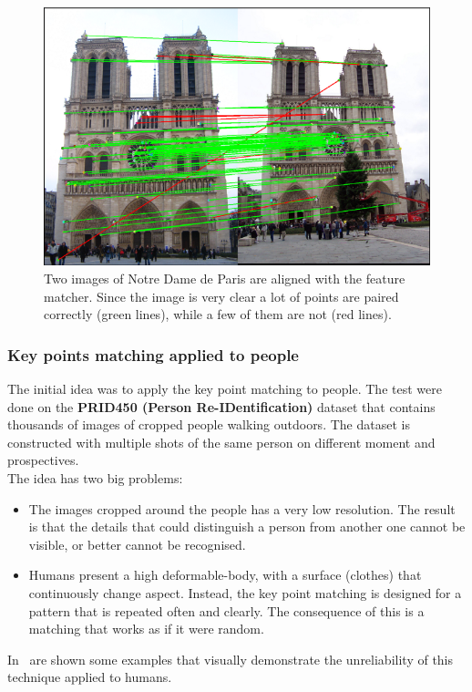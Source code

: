 \begin{figure}[!h]
	\centering
	\includegraphics[width=0.7\linewidth]{images/recognition/kpMatch_notreDame}
	\captionsetup{margin=0.5cm}
	\caption[Key points matching with Notre Dame comparison.]{Two images of Notre Dame de Paris are aligned with the feature matcher. Since the image is very clear a lot of points are paired correctly (green lines), while a few of them are not (red lines).}
	\label{fig:kpMatch_notreDame}
\end{figure}

\subsubsection*{Key points matching applied to people}
The initial idea was to apply the key point matching to people. The test were done on the \textbf{PRID450 (Person Re-IDentification)}\cite{prid450} dataset that contains thousands of images of cropped people walking outdoors. The dataset is constructed with multiple shots of the same person on different moment and prospectives.\\
The idea has two big problems:
\begin{itemize}
	\item The images cropped around the people has a very low resolution. The result is that the details that could distinguish a person from another one cannot be visible, or better cannot be recognised.
	\item Humans present a high deformable-body, with a surface (clothes) that continuously change aspect. Instead, the key point matching is designed for a pattern that is repeated often and clearly. The consequence of this is a matching that works as if it were random.
\end{itemize}
In~ are shown some examples that visually demonstrate the unreliability of this technique applied to humans.

